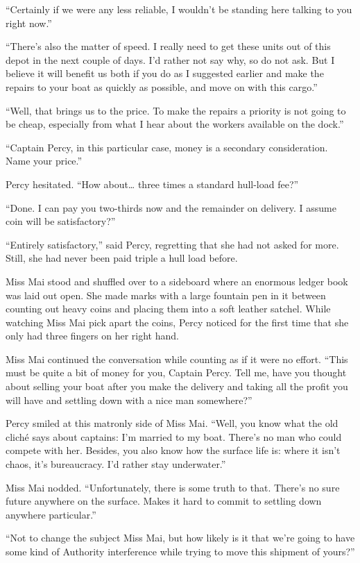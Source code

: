 \documentclass[
]{scrbook}
\begin{document}
``Certainly if we were any less reliable, I wouldn't be standing here
talking to you right now.''

``There's also the matter of speed. I really need to get these units out
of this depot in the next couple of days. I'd rather not say why, so do
not ask. But I believe it will benefit us both if you do as I suggested
earlier and make the repairs to your boat as quickly as possible, and
move on with this cargo.''

``Well, that brings us to the price. To make the repairs a priority is
not going to be cheap, especially from what I hear about the workers
available on the dock.''

``Captain Percy, in this particular case, money is a secondary
consideration. Name your price.''

Percy hesitated. ``How about\ldots{} three times a standard hull-load
fee?''

``Done. I can pay you two-thirds now and the remainder on delivery. I
assume coin will be satisfactory?''

``Entirely satisfactory,'' said Percy, regretting that she had not asked
for more. Still, she had never been paid triple a hull load before.

Miss Mai stood and shuffled over to a sideboard where an enormous ledger
book was laid out open. She made marks with a large fountain pen in it
between counting out heavy coins and placing them into a soft leather
satchel. While watching Miss Mai pick apart the coins, Percy noticed for
the first time that she only had three fingers on her right hand.

Miss Mai continued the conversation while counting as if it were no
effort. ``This must be quite a bit of money for you, Captain Percy. Tell
me, have you thought about selling your boat after you make the delivery
and taking all the profit you will have and settling down with a nice
man somewhere?''

Percy smiled at this matronly side of Miss Mai. ``Well, you know what
the old cliché says about captains: I'm married to my boat. There's no
man who could compete with her. Besides, you also know how the surface
life is: where it isn't chaos, it's bureaucracy. I'd rather stay
underwater.''

Miss Mai nodded. ``Unfortunately, there is some truth to that. There's
no sure future anywhere on the surface. Makes it hard to commit to
settling down anywhere particular.''

``Not to change the subject Miss Mai, but how likely is it that we're
going to have some kind of Authority interference while trying to move
this shipment of yours?''
\end{document}
